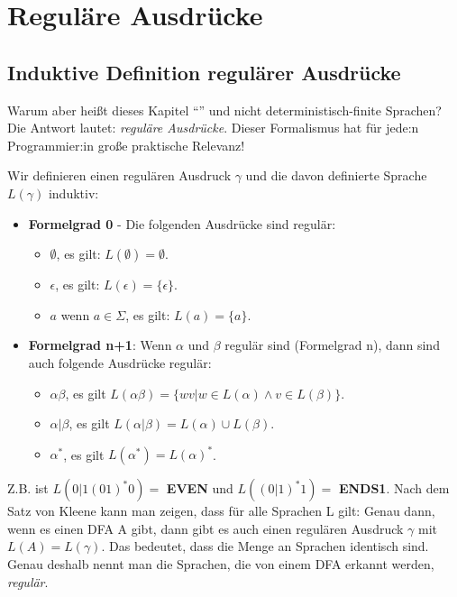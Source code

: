 \section{Reguläre Ausdrücke}\label{regex}

\subsection{Induktive Definition regulärer Ausdrücke}
Warum aber heißt dieses Kapitel ``''
und nicht deterministisch-finite Sprachen?
Die Antwort lautet: \emph{reguläre Ausdrücke}.
Dieser Formalismus hat für jede:n Programmier:in große praktische Relevanz!


Wir definieren einen regulären Ausdruck $\gamma$
und die davon definierte Sprache $L(\gamma)$ induktiv:
\begin{itemize}
    \item \textbf{Formelgrad 0} - Die folgenden Ausdrücke sind regulär:
        \begin{itemize}
            \item $\emptyset$, es gilt: $L(\emptyset) = \emptyset$.
            \item $\epsilon$,  es gilt: $L(\epsilon) = \{\epsilon\}$.
            \item $a$ wenn $a \in \Sigma$, es gilt: $L(a) = \{a\}$.
        \end{itemize}
    \item \textbf{Formelgrad n+1}: Wenn $\alpha$  und $\beta$ regulär sind (Formelgrad n),
        dann sind auch folgende Ausdrücke regulär:
        \begin{itemize}
            \item $\alpha\beta$,
                es gilt $L(\alpha\beta) = \{wv| w \in L(\alpha) \wedge v \in L(\beta)\}$.
            \item $\alpha|\beta$,
                es gilt $L(\alpha|\beta) = L(\alpha) \cup L(\beta)$. 
            \item $\alpha^*$,
                es gilt $L(\alpha^*) = L(\alpha)^*$.
        \end{itemize}
\end{itemize}

Z.B. ist $L(0|1(01)^*0) =$ \textbf{EVEN} und $L((0|1)^*1) =$ \textbf{ENDS1}.
Nach dem Satz von Kleene kann man zeigen, dass für alle Sprachen L gilt:
Genau dann, wenn es einen DFA A gibt, dann gibt es auch einen regulären Ausdruck $\gamma$
mit $L(A) = L(\gamma)$.
Das bedeutet, dass die Menge an Sprachen identisch sind.
Genau deshalb nennt man die Sprachen, die von einem DFA erkannt werden, \emph{regulär}.

